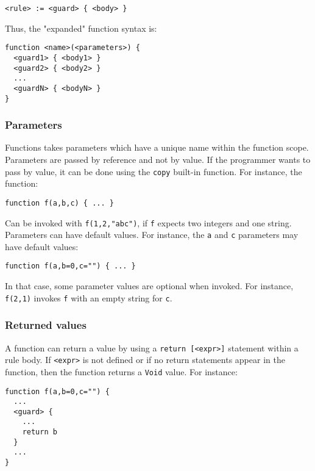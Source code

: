 \documentclass[11pt]{article}
\begin{document}
\begin{verbatim}
<rule> := <guard> { <body> }
\end{verbatim}

Thus, the "expanded" function syntax is:

\begin{verbatim}
function <name>(<parameters>) {
  <guard1> { <body1> }
  <guard2> { <body2> }
  ...
  <guardN> { <bodyN> }
}
\end{verbatim}

\subsubsection{Parameters}

Functions takes parameters which have a unique name within the function scope. Parameters are passed by reference and not by value. If the programmer wants to pass by value, it can be done using the \texttt{copy} built-in function. For instance, the function:

\begin{verbatim}
function f(a,b,c) { ... }
\end{verbatim}

Can be invoked with \texttt{f(1,2,"abc")}, if \texttt{f} expects two integers and one string. Parameters can have default values. For instance, the \texttt{a} and \texttt{c} parameters may have default values:

\begin{verbatim}
function f(a,b=0,c="") { ... }
\end{verbatim}

In that case, some parameter values are optional when invoked. For instance, \texttt{f(2,1)} invokes \texttt{f} with an empty string for \texttt{c}.

\subsubsection{Returned values}

A function can return a value by using a \texttt{return [<expr>]} statement within a rule body. If \texttt{<expr>} is not defined or if no return statements appear in the function, then the function returns a \texttt{Void} value. For instance:

\begin{lstlisting}
function f(a,b=0,c="") {
  ...
  <guard> {
    ...
    return b
  }
  ...
}
\end{lstlisting}
\end{document}
